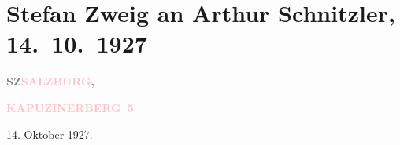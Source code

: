 

\renewcommand{\erwaehntePersonen}{Personen: Marceline Desbordes, Anatolij W. Lunačarski, Kote Marjanishvili, Hans Steinhoff, Leo N. von Tolstoi, Stefan Zweig}
\renewcommand{\erwaehnteInstitutionen}{Institutionen: Wremja}
\renewcommand{\erwaehnteOrte}{Orte: Paschinger Schlössl, Russland, Salzburg, Wien}
\renewcommand{\erwaehnteWerke}{Werke: Amok. Novelly, Angst, Angst, Brennendes Geheimnis, Das Haus am Meer. Ein Schauspiel in zwei Teilen (drei Aufzügen), Der Amokläufer, Marceline Desbordes-Valmore. Das Lebensbild einer Dichterin, Mutter, Dein Kind ruft{\rufezeichen}, Smjatenie Chusto, Sternstunden der Menschheit, Zach. Novella, Žgučaja tajna. Pervye pereživanija}
\section[Stefan Zweig an Arthur Schnitzler, 14. 10. 1927]{Stefan Zweig an Arthur Schnitzler, 14. 10. 1927}
\nopagebreak{}
\rehead{ }\normalsize\beginnumbering{}
\toendnotes[C]{\smallbreak\pagebreak[2]}
\toendnotes[C]{\smallbreak}
\pstart
           {\pb}\textcolor{gray}{\textbf{SZ}}\hfill \textcolor{gray}{\textbf{\textcolor{pink}{SALZBURG}{}\ledrightnote{\textcolor{pink}{Salzburg}},}}\pend
           
\pstart
           \raggedleft{}\textcolor{gray}{\textbf{\textcolor{pink}{KAPUZINERBERG 5}{}\ledrightnote{\textcolor{pink}{Paschinger Schlössl}}}}\pend
           
\pstart
           \raggedleft{}14. Oktober 1927.\pend
           
